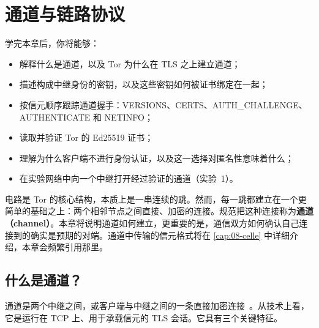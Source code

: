 \chapter{通道与链路协议}\label{cap:07-canali}

\begin{obiettivi}
学完本章后，你将能够：
\begin{itemize}[nosep]
  \item 解释什么是通道，以及 Tor 为什么在 TLS 之上建立通道；
  \item 描述构成中继身份的密钥，以及这些密钥如何被证书绑定在一起；
  \item 按信元顺序跟踪通道握手：VERSIONS、CERTS、AUTH\_CHALLENGE、AUTHENTICATE 和 NETINFO；
  \item 读取并验证 Tor 的 Ed25519 证书；
  \item 理解为什么客户端不进行身份认证，以及这一选择对匿名性意味着什么；
  \item 在实验网络中向一个中继打开经过验证的通道（实验~1）。
\end{itemize}
\end{obiettivi}

电路是 Tor 的核心结构，本质上是一串连续的跳。然而，每一跳都建立在一个更简单的基础之上：两个相邻节点之间直接、加密的连接。规范把这种连接称为\textbf{通道（channel）}。本章将说明通道如何建立，更重要的是，通信双方如何确认自己连接到的确实是预期的对端。通道中传输的信元格式将在 \cref{cap:08-celle} 中详细介绍，本章会频繁引用那里。

\section{什么是通道？}\label{sec:canale-def}

通道是两个中继之间，或客户端与中继之间的一条直接加密连接~。从技术上看，它是运行在 TCP 上、用于承载信元的 TLS 会话。它具有三个关键特征。

